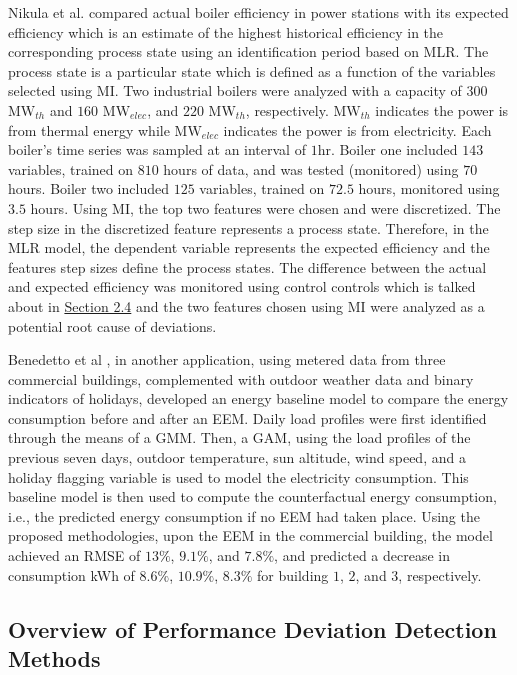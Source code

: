 Nikula et al.\cite{boiler} compared actual boiler efficiency in power stations with its expected efficiency which is an estimate of the highest historical efficiency in the corresponding process state using an identification period based on MLR. The process state is a particular state which is defined as a function of the variables selected using \ac{MI}. Two industrial boilers were analyzed with a capacity of $300$ $\text{MW}_{th}$ and $160$ $\text{MW}_{elec}$, and $220$ $\text{MW}_{th}$, respectively. $\text{MW}_{th}$ indicates the power is from thermal energy while $\text{MW}_{elec}$ indicates the power is from electricity. Each boiler's time series was sampled at an interval of $1$hr. Boiler one included $143$ variables, trained on $810$ hours of data, and was tested (monitored) using $70$ hours. Boiler two included $125$ variables, trained on $72.5$ hours, monitored using $3.5$ hours. Using MI, the top two features were chosen and were discretized. The step size in the discretized feature represents a process state. Therefore, in the MLR model, the dependent variable represents the expected efficiency and the features step sizes define the process states. The difference between the actual and expected efficiency was monitored using control controls which is talked about in \hyperlink{subsection.2.4}{Section 2.4} and the two features chosen using MI were analyzed as a potential root cause of deviations.

Benedetto et al \cite{data-driven-MV}, in another application, using metered data from three commercial buildings, complemented with outdoor weather data and binary indicators of holidays, developed an energy baseline model to compare the energy consumption before and after an \ac{EEM}. Daily load profiles were first identified through the means of a \ac{GMM}. Then, a \ac{GAM}, using the load profiles of the previous seven days, outdoor temperature, sun altitude, wind speed, and a holiday flagging variable is used to model the electricity consumption. This baseline model is then used to compute the counterfactual energy consumption, i.e., the predicted energy consumption if no EEM had taken place. Using the proposed methodologies, upon the EEM in the commercial building, the model achieved an RMSE of $13\%$, $9.1\%$, and $7.8\%$, and predicted a decrease in consumption \ac{kWh} of $8.6\%$, $10.9\%$, $8.3\%$ for building $1$, $2$, and $3$, respectively.

\subsection{Overview of Performance Deviation Detection Methods}

